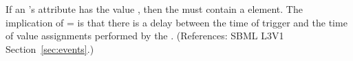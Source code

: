 If an \Event's  attribute has the value
, then the \Event must contain a \Delay element.  The
implication of = is that there
is a delay between the time of trigger and the time of value assignments
performed by the \Event.  (References: SBML L3V1 Section~\ref{sec:events}.)

